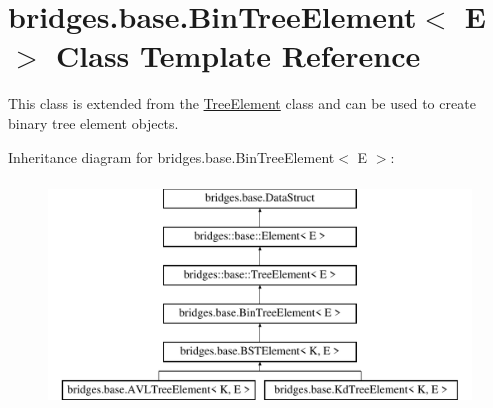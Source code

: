 \hypertarget{classbridges_1_1base_1_1_bin_tree_element}{}\section{bridges.\+base.\+Bin\+Tree\+Element$<$ E $>$ Class Template Reference}
\label{classbridges_1_1base_1_1_bin_tree_element}


This class is extended from the \mbox{\hyperlink{classbridges_1_1base_1_1_tree_element}{Tree\+Element}} class and can be used to create binary tree element objects.  


Inheritance diagram for bridges.\+base.\+Bin\+Tree\+Element$<$ E $>$\+:\begin{figure}[H]
\begin{center}
\leavevmode
\includegraphics[height=6.000000cm]{classbridges_1_1base_1_1_bin_tree_element}
\end{center}
\end{figure}
